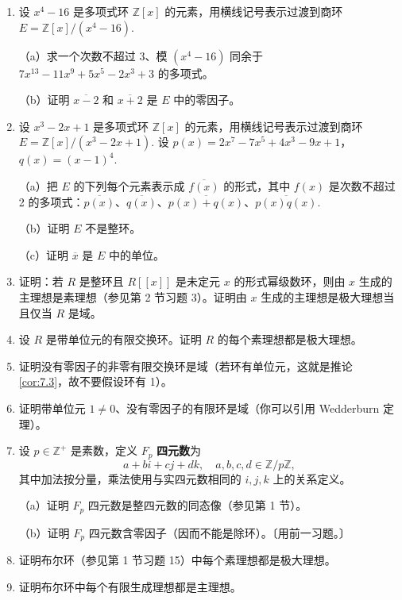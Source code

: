 \begin{enumerate}
\item 设 \(x^4 - 16\) 是多项式环 \(\mathbb{Z}[x]\) 的元素，用横线记号表示过渡到商环 \(E = \mathbb{Z}[x]/(x^4-16)\).

（a）求一个次数不超过 3、模 \((x^4-16)\) 同余于 \(7x^{13} - 11x^9 + 5x^5 - 2x^3 + 3\) 的多项式。

（b）证明 \(\overline{x-2}\) 和 \(\overline{x+2}\) 是 \(E\) 中的零因子。

\item 设 \(x^3 - 2x + 1\) 是多项式环 \(\mathbb{Z}[x]\) 的元素，用横线记号表示过渡到商环 \(E = \mathbb{Z}[x]/(x^3-2x+1)\). 设 \(p(x) = 2x^7 - 7x^5 + 4x^3 - 9x + 1\)，\(q(x) = (x-1)^4\).

（a）把 \(E\) 的下列每个元素表示成 \(\overline{f(x)}\) 的形式，其中 \(f(x)\) 是次数不超过 2 的多项式：\(\overline{p(x)}\)、\(\overline{q(x)}\)、\(\overline{p(x)+q(x)}\)、\(\overline{p(x)q(x)}\).

（b）证明 \(E\) 不是整环。

（c）证明 \(\overline{x}\) 是 \(E\) 中的单位。

\item 证明：若 \(R\) 是整环且 \(R[[x]]\) 是未定元 \(x\) 的形式幂级数环，则由 \(x\) 生成的主理想是素理想（参见第 2 节习题 3）。证明由 \(x\) 生成的主理想是极大理想当且仅当 \(R\) 是域。

\item 设 \(R\) 是带单位元的有限交换环。证明 \(R\) 的每个素理想都是极大理想。

\item 证明没有零因子的非零有限交换环是域（若环有单位元，这就是推论 \ref{cor:7.3}，故不要假设环有 1）。

\item 证明带单位元 \(1 \neq 0\)、没有零因子的有限环是域（你可以引用 Wedderburn 定理）。

\item 设 \(p \in \mathbb{Z}^+\) 是素数，定义 \(F_p\) \textbf{四元数}为
\[
a + bi + cj + dk, \quad a, b, c, d \in \mathbb{Z}/p\mathbb{Z},
\]
其中加法按分量，乘法使用与实四元数相同的 \(i, j, k\) 上的关系定义。

（a）证明 \(F_p\) 四元数是整四元数的同态像（参见第 1 节）。

（b）证明 \(F_p\) 四元数含零因子（因而不能是除环）。〔用前一习题。〕

\item 证明布尔环（参见第 1 节习题 15）中每个素理想都是极大理想。

\item 证明布尔环中每个有限生成理想都是主理想。


\end{enumerate}
